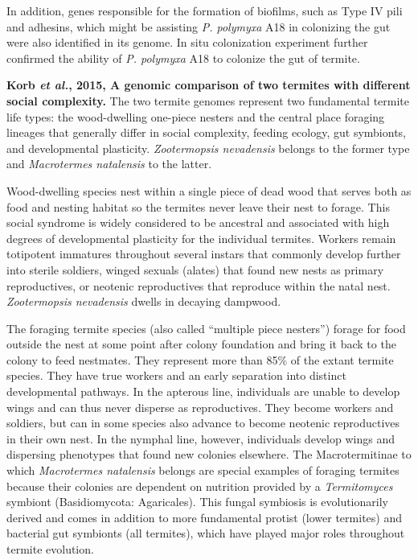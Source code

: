 \documentclass[11pt]{article}
\begin{document}
\begin{sloppypar}
In addition, genes responsible for the formation of biofilms, such as Type IV pili and adhesins, which might be assisting \textit{P. polymyxa} A18 in colonizing the gut were also identified in its genome. 
In situ colonization experiment further confirmed the ability of \textit{P. polymyxa} A18 to colonize the gut of termite. 
\par
\textbf{Korb \textit{et al.}, 2015, A genomic comparison of two termites with different social complexity.} \newline
The two termite genomes represent two fundamental termite life types: the wood-dwelling one-piece nesters and the central place foraging lineages that generally differ in social complexity, feeding ecology, gut symbionts, and developmental plasticity. 
\textit{Zootermopsis nevadensis} belongs to the former type and \textit{Macrotermes natalensis} to the latter. 
\par
Wood-dwelling species nest within a single piece of dead wood that serves both as food and nesting habitat so the termites never leave their nest to forage. 
This social syndrome is widely considered to be ancestral and associated with high degrees of developmental plasticity for the individual termites. 
Workers remain totipotent immatures throughout several instars that commonly develop further into sterile soldiers, winged sexuals (alates) that found new nests as primary reproductives, or neotenic reproductives that reproduce within the natal nest. 
\textit{Zootermopsis nevadensis} dwells in decaying dampwood. 
\par
The foraging termite species (also called “multiple piece nesters”) forage for food outside the nest at some point after colony foundation and bring it back to the colony to feed nestmates. 
They represent more than 85\% of the extant termite species. 
They have true workers and an early separation into distinct developmental pathways. 
In the apterous line, individuals are unable to develop wings and can thus never disperse as reproductives. They become workers and soldiers, but can in some species also advance to become neotenic reproductives in their own nest. 
In the nymphal line, however, individuals develop wings and dispersing phenotypes that found new colonies elsewhere. 
The Macrotermitinae to which \textit{Macrotermes natalensis} belongs are special examples of foraging termites because their colonies are dependent on nutrition provided by a \textit{Termitomyces} symbiont (Basidiomycota: Agaricales). 
This fungal symbiosis is evolutionarily derived and comes in addition to more fundamental protist (lower termites) and bacterial gut symbionts (all termites), which have played major roles throughout termite evolution. 

\end{sloppypar}
\end{document}

